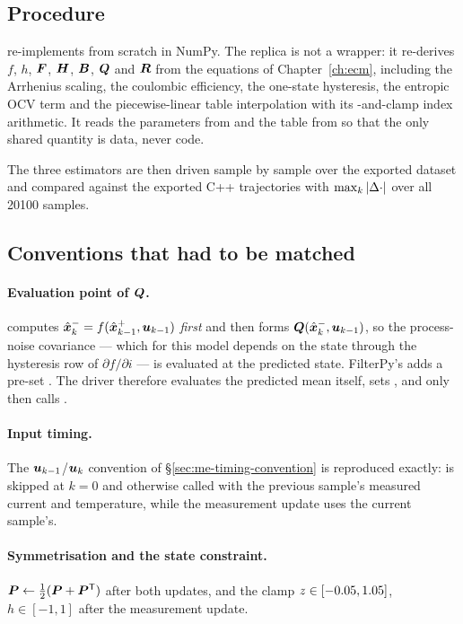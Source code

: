 \subsection{Procedure}

 re-implements  from scratch in NumPy.
The replica is not a wrapper: it re-derives $f$, $h$, $\bm{F}$, $\bm{H}$, $\bm{B}$, $\bm{Q}$ and $\bm{R}$ from the
equations of Chapter~\ref{ch:ecm}, including the Arrhenius scaling, the coulombic efficiency, the
one-state hysteresis, the entropic OCV term and the piecewise-linear table interpolation with its
-and-clamp index arithmetic. It reads the parameters from  and the
table from  so that the only shared quantity is data, never code.

The three estimators are then driven sample by sample over the exported dataset and compared
against the exported C++ trajectories with $\max_k\left\lvert \Delta\cdot \right\rvert$ over all \num{20100} samples.

\subsection{Conventions that had to be matched}

\paragraph{Evaluation point of $\bm{Q}$.}  computes $\hat{\bm{x}}^{-}_k = f(\hat{\bm{x}}^{+}_{k-1},\bm{u}_{k-1})$
\emph{first} and then forms $\bm{Q}(\hat{\bm{x}}^{-}_k,\bm{u}_{k-1})$, so the process-noise covariance --- which for
this model depends on the state through the hysteresis row of $\partial f/\partial i$ --- is
evaluated at the predicted state. FilterPy's  adds a pre-set . The
driver therefore evaluates the predicted mean itself, sets , and only
then calls .

\paragraph{Input timing.} The $\bm{u}_{k-1}$/$\bm{u}_k$ convention of \S\ref{sec:me-timing-convention} is
reproduced exactly:  is skipped at $k=0$ and otherwise called with the previous
sample's measured current and temperature, while the measurement update uses the current sample's.

\paragraph{Symmetrisation and the state constraint.} $\bm{P}\gets\frac12(\bm{P}+\bm{P}^{\mathsf{T}})$ after both
updates, and the clamp $z\in[-0.05,1.05]$, $h\in[-1,1]$ after the measurement update.

